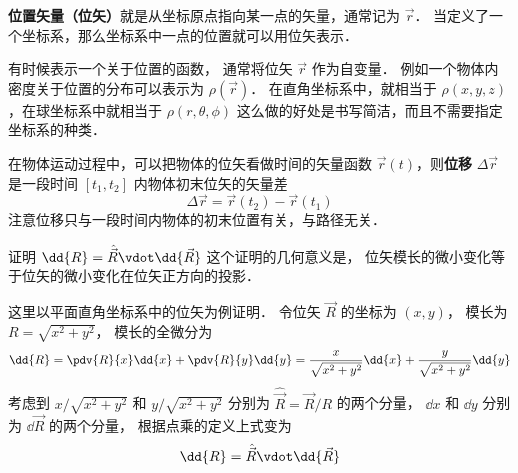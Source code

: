

\textbf{位置矢量（位矢）}就是从坐标原点指向某一点的矢量，通常记为 $\vec r$． 当定义了一个坐标系，那么坐标系中一点的位置就可以用位矢表示．

有时候表示一个关于位置的函数， 通常将位矢 $\vec r$ 作为自变量． 例如一个物体内密度关于位置的分布可以表示为 $\rho(\vec r)$． 在直角坐标系中，就相当于 $\rho(x,y,z)$，在球坐标系中就相当于 $\rho(r,\theta,\phi)$ 这么做的好处是书写简洁，而且不需要指定坐标系的种类．

在物体运动过程中，可以把物体的位矢看做时间的矢量函数 $\vec r(t)$，则\textbf{位移} $\Delta \vec r$ 是一段时间 $[t_1,t_2]$ 内物体初末位矢的矢量差
\begin{equation}
\Delta \vec r = \vec r(t_2) - \vec r(t_1)
\end{equation}
注意位移只与一段时间内物体的初末位置有关，与路径无关．

\begin{exam}{证明 $\dd{R} = \hat{\vec R} \vdot \dd{\vec R}$}\label{Disp_ex1}
这个证明的几何意义是， 位矢模长的微小变化等于位矢的微小变化在位矢正方向的投影．

这里以平面直角坐标系中的位矢为例证明． 令位矢 $\vec R$ 的坐标为 $(x, y)$， 模长为 $R = \sqrt{x^2 + y^2}$，
模长的全微分为
\begin{equation}
\dd{R} = \pdv{R}{x} \dd{x} + \pdv{R}{y} \dd{y} = \frac{x}{\sqrt{x^2 + y^2}} \dd{x} + \frac{y}{\sqrt{x^2 + y^2}} \dd{y}
\end{equation}
考虑到 $x/\sqrt{x^2 + y^2}$ 和 $y/\sqrt{x^2 + y^2}$ 分别为 $\hat {\vec R} = \vec R/R$ 的两个分量， $\dd{x}$ 和 $\dd{y}$ 分别为 $\dd{\vec R}$ 的两个分量， 根据点乘的定义上式变为
\begin{equation}
\dd{R} = \hat{\vec R} \vdot \dd{\vec R}
\end{equation}
\end{exam}









